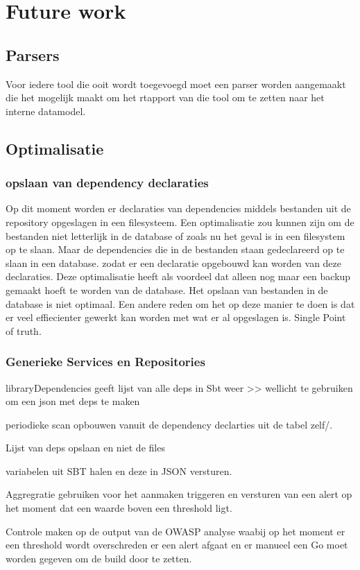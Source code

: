 
\chapter{Future work}\label{ch:name} %


\section{Parsers}\label{sec:parsers}
Voor iedere tool die ooit wordt toegevoegd moet een parser worden aangemaakt die het mogelijk maakt om het rtapport van die tool om te zetten naar het interne datamodel.




\section{Optimalisatie}

\subsection{opslaan van dependency declaraties}
Op dit moment worden er declaraties van dependencies middels bestanden uit de repository opgeslagen in een filesysteem. Een optimalisatie zou kunnen zijn om de bestanden niet letterlijk in de database of zoals nu het geval is in een filesystem op te slaan. Maar de dependencies die in de bestanden staan gedeclareerd op te slaan in een database. zodat er een declaratie opgebouwd kan worden van deze declaraties. Deze optimalisatie heeft als voordeel dat alleen nog maar een backup gemaakt hoeft te worden van de database. Het opslaan van bestanden in de database is niet optimaal. Een andere reden om het op deze manier te doen is dat er veel effiecienter gewerkt kan worden met wat er al opgeslagen is. Single Point of truth.



\subsection{Generieke Services en Repositories}

libraryDependencies geeft lijst van alle deps in Sbt weer >> wellicht te gebruiken om een json met deps te maken


periodieke scan opbouwen vanuit de dependency declarties uit de tabel zelf/.

Lijst van deps opslaan en niet de files

variabelen uit SBT halen en deze in JSON versturen.

Aggregratie gebruiken voor het aanmaken triggeren en versturen van een alert op het moment dat een waarde boven een threshold ligt.

Controle maken op de output van de OWASP analyse waabij op het moment er een threshold wordt overschreden er een alert afgaat en er manueel een Go moet worden gegeven om de build door te zetten.

